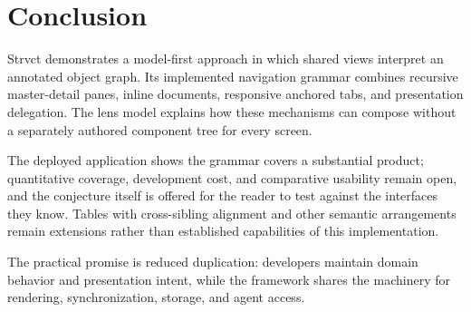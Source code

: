 \documentclass[sigplan,review,anonymous,10pt]{acmart}
\begin{document}
\section{Conclusion}
\label{sec:conclusion}

Strvct demonstrates a model-first approach in which shared views interpret an annotated object graph. Its implemented navigation grammar combines recursive master-detail panes, inline documents, responsive anchored tabs, and presentation delegation. The lens model explains how these mechanisms can compose without a separately authored component tree for every screen.

The deployed application shows the grammar covers a substantial product; quantitative coverage, development cost, and comparative usability remain open, and the conjecture itself is offered for the reader to test against the interfaces they know. Tables with cross-sibling alignment and other semantic arrangements remain extensions rather than established capabilities of this implementation.

The practical promise is reduced duplication: developers maintain domain behavior and presentation intent, while the framework shares the machinery for rendering, synchronization, storage, and agent access.


\end{document}
